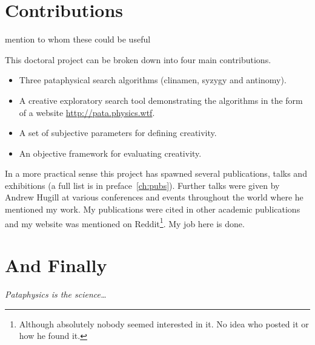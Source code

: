 \section{Contributions}

mention to whom these could be useful


This doctoral project can be broken down into four main contributions.

\begin{itemize}
  \item Three pataphysical search algorithms (clinamen, syzygy and antinomy).
  \item A creative exploratory search tool demonstrating the algorithms in the form of a website \url{http://pata.physics.wtf}.
  \item A set of subjective parameters for defining creativity.
  \item An objective framework for evaluating creativity.
\end{itemize}

In a more practical sense this project has spawned several publications, talks and exhibitions (a full list is in preface~\ref{ch:pubs}). Further talks were given by Andrew Hugill at various conferences and events throughout the world where he mentioned my work. My publications were cited in other academic publications and my website was mentioned on Reddit\footnote{Although absolutely nobody seemed interested in it. No idea who posted it or how he found it.}. My job here is done.


\section{And Finally}

\emph{Pataphysics is the science\ldots}

\stopcontents[chapters]
